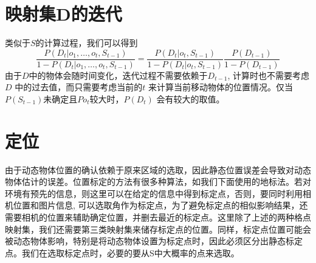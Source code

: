 \section{映射集D的迭代}
类似于$S$的计算过程，我们可以得到
\begin{equation*}
\dfrac{P(D_t|o_1,\dots,o_t,S_{t-1})}{1-P({D_t}|o_1,\dots,o_t,S_{t-1})} = \dfrac{P(D_t|o_t,S_{t-1})}{1-P({D_t}|o_t,S_{t-1})}\dfrac{P(D_{t-1})}{1-P(D_{t-1})}
\end{equation*}
由于$D$中的物体会随时间变化，迭代过程不需要依赖于$D_{t-1}$, 计算时也不需要考虑 $D$ 中的过去值，而只需要考虑当前的$t$ 来计算当前移动物体的位置情况。仅当$P(S_{t-1})$未确定且$P{o_t}$较大时，$P(D_t)$ 会有较大的取值。\cite{wolf2005mobile}
\section{定位}
由于动态物体位置的确认依赖于原来区域的选取，因此静态位置误差会导致对动态物体估计的误差。位置标定的方法有很多种算法，如我们下面使用的地标法。若对环境有预先的信息，则这里可以在给定的信息中得到标定点，否则，要同时利用相机位置和图片信息\cite{dissanayake2001solution}, 可以选取角作为标定点\cite{tomasi1991detection}，为了避免标定点的相似影响结果，还需要相机的位置来辅助确定位置，并删去最近的标定点。这里除了上述的两种格点映射集，我们还需要第三类映射集来储存标定点的位置。同样，标定点位置可能会被动态物体影响，特别是将动态物体设置为标定点时，因此必须区分出静态标定点。我们在选取标定点时，必要的要从S中大概率的点来选取。
